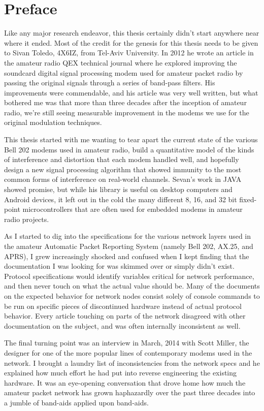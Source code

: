 \chapter{Preface}

Like any major research endeavor, this thesis certainly didn't start anywhere near
where it ended.
Most of the credit for the genesis for this thesis needs to be given to 
Sivan Toledo, 4X6IZ, from Tel-Aviv University. In 2012 he wrote an article in the
amateur radio QEX technical journal where he explored improving the soundcard 
digital signal processing modem used for amateur packet radio by passing the 
original signals through a series of band-pass filters. His improvements were
commendable, and his article was very well written, but what bothered me was that 
more than three decades after the inception of amateur radio, we're still seeing
measurable improvement in the modems we use for the original modulation techniques.

This thesis started with me wanting to tear apart the current state of the various
Bell 202 modems used in amateur radio, build a quantitative model of the kinds of
interference and distortion that each modem handled well, and hopefully design
a new signal processing algorithm that showed immunity to the most common forms of
interference on real-world channels. Sevan's work in JAVA showed promise, but 
while his library is useful on desktop computers and Android devices, it left 
out in the cold the many different 8, 16, and 32 bit fixed-point microcontrollers
that are often used for embedded modems in amateur radio projects.

As I started to dig into the specifications for the various network layers used
in the amateur Automatic Packet Reporting System (namely Bell 202, AX.25, and
APRS), I grew increasingly shocked and confused when I kept finding that the
documentation I was looking for was skimmed over or simply didn't exist. 
Protocol specifications would identify variables critical for network performance,
and then never touch on what the actual value should be. Many of the documents
on the expected behavior for network nodes consist solely of console commands
to be run on specific pieces of discontinued hardware instead of actual protocol
behavior. Every article touching on parts of the network disagreed with 
other documentation on the subject, and was often internally inconsistent as well.

The final turning point was an interview in March, 2014 with Scott Miller, the
designer for one of the more popular lines of contemporary modems used in the
network.
I brought a laundry list of inconsistencies from the network specs and he
explained how much effort he had put into reverse engineering the existing 
hardware. It was an eye-opening conversation that drove home how much the 
amateur packet network has grown haphazardly over the past three decades into
a jumble of band-aids applied upon band-aids.

